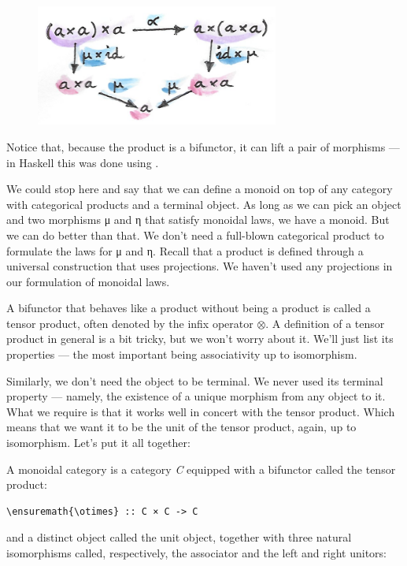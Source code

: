 \begin{figure}[H]
\centering
\includegraphics[width=80mm]{images/assocmon.png}
\end{figure}

\noindent
Notice that, because the product is a bifunctor, it can lift a pair of
morphisms --- in Haskell this was done using .

We could stop here and say that we can define a monoid on top of any
category with categorical products and a terminal object. As long as we
can pick an object  and two morphisms μ and η that satisfy
monoidal laws, we have a monoid. But we can do better than that. We
don't need a full-blown categorical product to formulate the laws for μ
and η. Recall that a product is defined through a universal construction
that uses projections. We haven't used any projections in our
formulation of monoidal laws.

A bifunctor that behaves like a product without being a product is
called a tensor product, often denoted by the infix operator \ensuremath{\otimes}. A
definition of a tensor product in general is a bit tricky, but we won't
worry about it. We'll just list its properties --- the most important
being associativity up to isomorphism.

Similarly, we don't need the object  to be terminal. We never
used its terminal property --- namely, the existence of a unique
morphism from any object to it. What we require is that it works well in
concert with the tensor product. Which means that we want it to be the
unit of the tensor product, again, up to isomorphism. Let's put it all
together:

A monoidal category is a category \emph{C} equipped with a bifunctor
called the tensor product:

\begin{Verbatim}[commandchars=\\\{\}]
\ensuremath{\otimes} :: C × C -> C
\end{Verbatim}
and a distinct object  called the unit object, together with
three natural isomorphisms called, respectively, the associator and the
left and right unitors:

